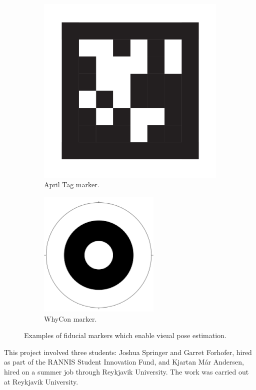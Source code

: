 \begin{figure}
    \centering
    \begin{subfigure}[b]{0.25\textwidth}
        \centering
        \includegraphics[width=\textwidth]{images/tag_36h11.png}
        \caption{April Tag marker.}
        \label{fig:april_tag}
    \end{subfigure}
    \begin{subfigure}[b]{0.25\textwidth}
        \centering
        \includegraphics[width=\textwidth]{images/whycon.png}
        \caption{WhyCon marker.}
        \label{fig:whycon}
    \end{subfigure}
    \caption{Examples of fiducial markers which enable visual pose estimation.}
\end{figure}

This project involved three students: Joshua Springer and Garret Forhofer, hired as part of the RANNIS Student Innovation Fund, and Kjartan Már Andersen, hired on a summer job through Reykjavik University. The work was carried out at Reykjavik University.